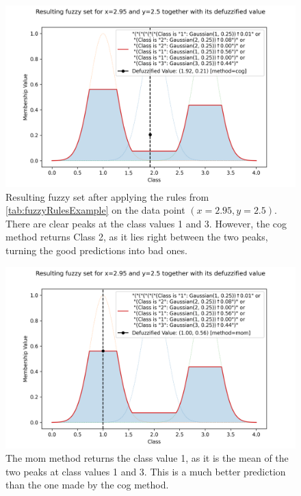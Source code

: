\begin{multicols}{2}

    \begin{figure}[H]
        \centering
        \includegraphics[width=0.9\columnwidth,trim={0 0 0 1cm},clip]{figures/ProofOfConcepts/fuzzy_set_for_data_cog.png}
        \caption[Resulting Fuzzy Set after applying the Rules on specific Data, COG Method]{Resulting fuzzy set after applying the rules from \autoref{tab:fuzzyRulesExample} on the data point $(x=2.95, y=2.5)$. There are clear peaks at the class values 1 and 3. However, the \gls{cog} method returns Class 2, as it lies right between the two peaks, turning the good predictions into bad ones.}
        \label{fig:fuzzySetForDataCOG}
    \end{figure}

    \columnbreak

    \begin{figure}[H]
        \centering
        \includegraphics[width=0.9\columnwidth,trim={0 0 0 1cm},clip]{figures/ProofOfConcepts/fuzzy_set_for_data_mom.png}
        \caption[Resulting Fuzzy Set after applying the Rules on specific Data, MOM Method]{The \gls{mom} method returns the class value 1, as it is the mean of the two peaks at class values 1 and 3. This is a much better prediction than the one made by the \gls{cog} method.}

        \label{fig:fuzzySetForDataMOM}
    \end{figure}

\end{multicols}

